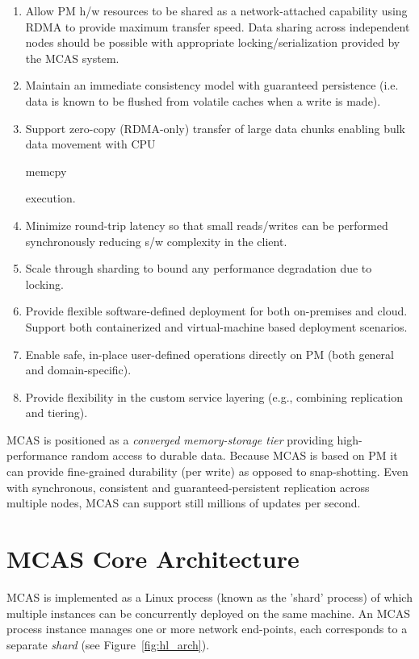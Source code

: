 \documentclass[letterpaper,twocolumn,10pt]{article}
\newcommand{\pmem}{PM\xspace}
\newcommand{\code}[1]{\begin{ttcodefont}#1\end{ttcodefont}}
\begin{document}
\begin{enumerate}

\item Allow \pmem h/w resources to be shared as a network-attached
  capability using RDMA to provide maximum transfer speed.  Data
  sharing across independent nodes should be possible with appropriate
  locking/serialization provided by the MCAS system.
\item Maintain an immediate consistency model with guaranteed
  persistence (i.e. data is known to be flushed from volatile caches when a write is made).
\item Support zero-copy (RDMA-only) transfer of large data chunks
  enabling bulk data movement with CPU \code{memcpy} execution.
\item Minimize round-trip latency so that small reads/writes can be
  performed synchronously reducing s/w complexity in the client.
\item Scale through sharding to bound any performance degradation due
  to locking.
\item Provide flexible software-defined deployment for both
  on-premises and cloud.  Support both containerized and
  virtual-machine based deployment scenarios.
\item Enable safe, in-place user-defined operations directly on \pmem
  (both general and domain-specific).
\item Provide flexibility in the custom service layering (e.g.,
  combining replication and tiering).
  
\end{enumerate}

MCAS is positioned as a \textit{converged memory-storage tier}
providing high-performance random access to durable data.  Because
MCAS is based on \pmem it can provide fine-grained durability (per
write) as opposed to snap-shotting.  Even with synchronous, consistent
and guaranteed-persistent replication across multiple nodes, MCAS can
support still millions of updates per second.


\section{MCAS Core Architecture}

MCAS is implemented as a Linux process (known as the 'shard' process)
of which multiple instances can be concurrently deployed on the same
machine.  An MCAS process instance manages one or more network
end-points, each corresponds to a separate \textit{shard} (see
Figure~\ref{fig:hl_arch}).  
\end{document}
